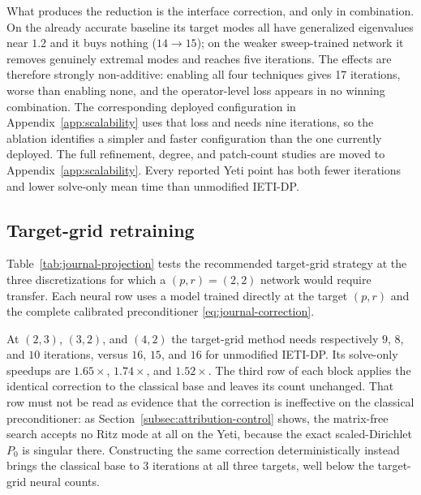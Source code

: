 \documentclass{article}
\theoremstyle{plain}
\numberwithin{equation}{section}
\begin{document}
What produces the reduction is the interface correction, and only in
combination.  On the already accurate baseline its target modes all have
generalized eigenvalues near $1.2$ and it buys nothing ($14\to15$); on the
weaker sweep-trained network it removes genuinely extremal modes and reaches
five iterations.  The effects are therefore strongly non-additive: enabling
all four techniques gives 17 iterations, worse than enabling none, and the
operator-level loss appears in no winning combination.  The corresponding
deployed configuration in Appendix~\ref{app:scalability} uses that loss and
needs nine iterations, so the ablation identifies a simpler and faster
configuration than the one currently deployed.
The full refinement, degree, and patch-count studies are moved to
Appendix~\ref{app:scalability}.  Every reported Yeti point has both fewer
iterations and lower solve-only mean time than unmodified IETI-DP.

\FloatBarrier

\subsection{Target-grid retraining}
\label{subsec:yeti-projection-results}

Table~\ref{tab:journal-projection} tests the recommended target-grid strategy
at the three discretizations for which a $(p,r)=(2,2)$ network would require
transfer.  Each neural row uses a model trained directly at the target
$(p,r)$ and the complete calibrated preconditioner
\eqref{eq:journal-correction}.

\begin{table}[t]
    \centering
    \caption{Yeti target-grid retraining study.  Every row reports solve-only
        time and PCG iterations at tolerance $10^{-8}$; means use 50 solves and
        exclude setup.}
    \label{tab:journal-projection}
    
\end{table}

At $(2,3)$, $(3,2)$, and $(4,2)$ the target-grid method needs respectively
$9$, $8$, and $10$ iterations, versus $16$, $15$, and $16$ for unmodified
IETI-DP.  Its solve-only speedups are $1.65\times$, $1.74\times$, and
$1.52\times$.  The third row of each block applies the identical correction to
the classical base and leaves its count unchanged.  That row must not be read
as evidence that the correction is ineffective on the classical
preconditioner: as Section~\ref{subsec:attribution-control} shows, the
matrix-free search accepts no Ritz mode at all on the Yeti, because the exact
scaled-Dirichlet $P_0$ is singular there.  Constructing the same correction
deterministically instead brings the classical base to $3$ iterations at all
three targets, well below the target-grid neural counts.
\end{document}
